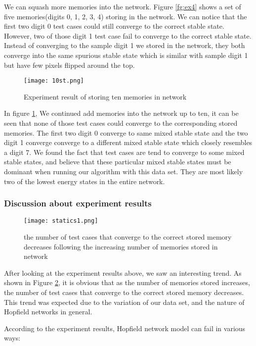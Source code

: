 We can squash more memories into the network. Figure \ref{fg:ex4} shows a set of five memories(digits 0, 1, 2, 3, 4) storing in the network. We can notice that the first two digit 0 test cases could still converge to the correct stable state. However, two of those digit 1 test case fail to converge to the correct stable state. Instead of converging to the sample digit 1 we stored in the network, they both converge into the same spurious stable state which is similar with sample digit 1 but have few pixels flipped around the top.\\

\begin{figure}[h]
\centering
\texttt{[image: 10st.png]}
\caption{Experiment result of storing ten memories in network}
\label{fg:ex5}
\end{figure}

In figure \ref{fg:ex5}, We continued add memories into the network up to ten, it can be seen that none of those test cases could converge to the corresponding stored memories. The first two digit 0 converge to same mixed stable state and the two digit 1 converge converge to a different mixed stable state which closely resembles a digit 7. We found the fact that test cases are tend to converge to some mixed stable states, and believe that these particular mixed stable states must be dominant when running our algorithm with this data set. They are most likely two of the lowest energy states in the entire network.

\subsubsection{Discussion about experiment results}
\begin{figure}[h]
\centering
\texttt{[image: statics1.png]}
\caption{the number of test cases that converge to the correct stored memory decreases following the increasing number of memories stored in network}
\label{fg:ex6}
\end{figure}
After looking at the experiment results above, we saw an interesting trend. As shown in Figure \ref{fg:ex6}, it is obvious that as the number of memories stored increases, the number of test cases that converge to the correct stored memory decreases. This trend was expected due to the variation of our data set, and the nature of Hopfield networks in general. \newpage

According to the experiment results, Hopfield network model can fail in various ways:\\

